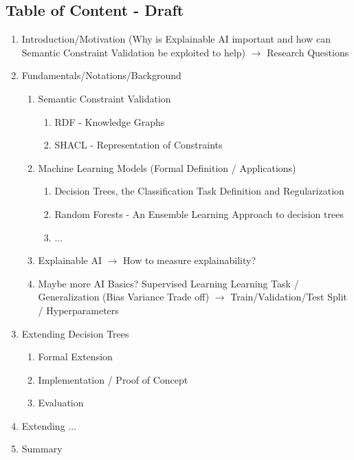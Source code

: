 \documentclass[../../thesis]{subfiles}
\begin{document}
\subsection{Table of Content - Draft}
\begin{enumerate}
    \item Introduction/Motivation (Why is Explainable AI important and how can Semantic Constraint Validation be exploited to help) $\rightarrow$ Research Questions
    \item Fundamentals/Notations/Background
    \begin{enumerate}
        \item Semantic Constraint Validation
        \begin{enumerate}
            \item RDF - Knowledge Graphs
            \item SHACL - Representation of Constraints
        \end{enumerate}
        \item Machine Learning Models (Formal Definition / Applications)
        \begin{enumerate}
            \item Decision Trees, the Classification Task Definition and Regularization
            \item Random Forests - An Ensemble Learning Approach to decision trees
            \item ...
        \end{enumerate}
        \item Explainable AI $\rightarrow$ How to measure explainability?
        \item Maybe more AI Basics? Supervised Learning Learning Task / Generalization (Bias Variance Trade off) $\rightarrow$ Train/Validation/Test Split / Hyperparameters
    \end{enumerate}
    \item Extending Decision Trees
    \begin{enumerate}
        \item Formal Extension
        \item Implementation / Proof of Concept
        \item Evaluation
    \end{enumerate}
    \item Extending ...
    \item Summary
\end{enumerate}
\end{document}

